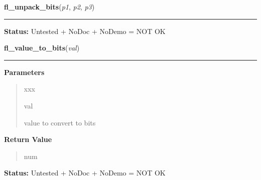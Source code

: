     \vspace{0.5ex}

\hspace{.8\funcindent}\begin{boxedminipage}{\funcwidth}

    \raggedright \textbf{fl\_unpack\_bits}(\textit{p1}, \textit{p2}, \textit{p3})

    \vspace{-1.5ex}

    \rule{\textwidth}{0.5\fboxrule}
\setlength{\parskip}{2ex}
\setlength{\parskip}{1ex}
\textbf{Status:} Untested + NoDoc + NoDemo = NOT OK



    \end{boxedminipage}

    \label{xformslib:flflimage:fl_value_to_bits}

    \vspace{0.5ex}

\hspace{.8\funcindent}\begin{boxedminipage}{\funcwidth}

    \raggedright \textbf{fl\_value\_to\_bits}(\textit{val})

    \vspace{-1.5ex}

    \rule{\textwidth}{0.5\fboxrule}
\setlength{\parskip}{2ex}
\setlength{\parskip}{1ex}
      \textbf{Parameters}
      \vspace{-1ex}

      \begin{quote}
        \begin{Ventry}{xxx}

          \item[val]

          value to convert to bits

        \end{Ventry}

      \end{quote}

      \textbf{Return Value}
    \vspace{-1ex}

      \begin{quote}
      num

      \end{quote}

\textbf{Status:} Untested + NoDoc + NoDemo = NOT OK



    \end{boxedminipage}

